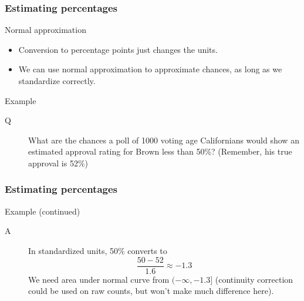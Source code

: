 \documentclass[handout]{beamer}
\begin{document}

   \begin{frame} \frametitle{Estimating percentages}

   \begin{block}
   {Normal approximation}
   \begin{itemize}
   \item Conversion to percentage points just changes the units.
   \item We can use normal approximation to approximate chances,
   as long as we standardize correctly.

   \end{itemize}
   \end{block}

   \begin{block}
   {Example}
   \begin{description}
   \item[Q] What are the chances a poll of 1000 voting age Californians
   would show an estimated approval rating for Brown less than 50\%?
   (Remember, his true approval is {\color{blue} 52\%})

   \end{description}
   \end{block}
   \end{frame}


   \begin{frame} \frametitle{Estimating percentages}

   \begin{block}
   {Example (continued)}
   \begin{description}
   \item[A] In standardized units, 50\% converts to
   $$
   \frac{50-52}{1.6} \approx -1.3
   $$
   We need area under normal curve from $(-\infty,-1.3]$ (continuity
   correction could be used on raw counts, but won't make much difference
   here).
   \end{description}
   \end{block}
   \end{frame}

\end{document}
